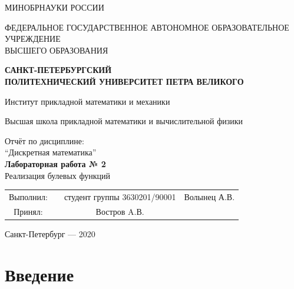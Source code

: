 \documentclass[a4paper]{article}
\theoremstyle{plain}
\theoremstyle{definition*}
\theoremstyle{remark}
\begin{document}
\begin{titlepage}
\begin{center}
\Large{МИНОБРНАУКИ РОССИИ}

\large{ФЕДЕРАЛЬНОЕ ГОСУДАРСТВЕННОЕ АВТОНОМНОЕ ОБРАЗОВАТЕЛЬНОЕ УЧРЕЖДЕНИЕ \\
ВЫСШЕГО ОБРАЗОВАНИЯ}

\large{\bfseries САНКТ-ПЕТЕРБУРГСКИЙ \\
ПОЛИТЕХНИЧЕСКИЙ УНИВЕРСИТЕТ ПЕТРА ВЕЛИКОГО}

\vspace{1.05 cm} 
Институт прикладной математики и механики

\vspace{1.05 cm} 
Высшая школа прикладной математики и вычислительной физики
\end{center}

\vspace{1cm}

\begin{center}
{ 
\large    Отчёт по дисциплине:\\
	``Дискретная математика''\\
    \textbf{Лабораторная работа № 2} \\
     Реализация булевых функций

}
\end{center}

\vspace{5cm}


\begin{center}
	\begin{tabular}{cccc}
		{\normalsize Выполнил:} & \underline{\hspace{3cm}} & {\normalsize студент группы 3630201/90001} &{\normalsize Волынец А.В.} \\
		{\normalsize	Принял:} & \underline{\hspace{3cm}} & {\normalsize Востров A.В.} \\
	\end{tabular}
\end{center}

\vspace{1.8cm}
\begin{center}
Санкт-Петербург — 2020
\end{center}

\end{titlepage}

\tableofcontents 
\newpage

\section*{Введение}
\end{document}
